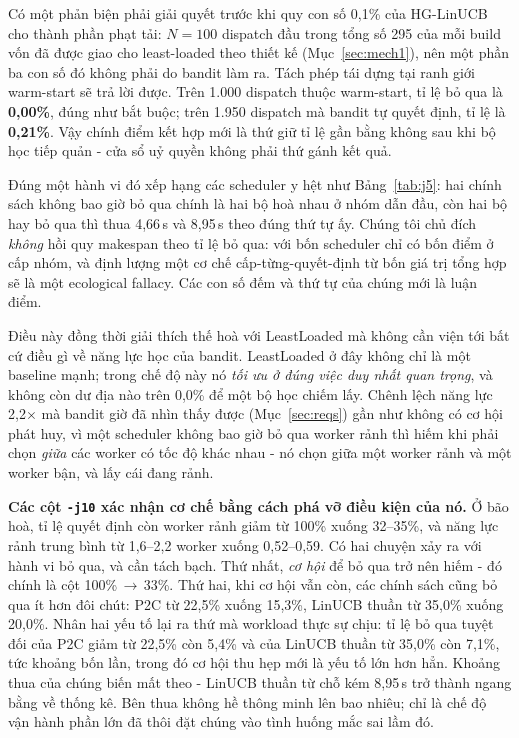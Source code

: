 \documentclass[final,5p,times,twocolumn]{elsarticle}
\begin{document}
Có một phản biện phải giải quyết trước khi quy con số 0,1\% của HG-LinUCB cho thành phần phạt tải: $N=100$ dispatch đầu trong tổng số 295 của mỗi build vốn đã được giao cho least-loaded theo thiết kế (Mục~\ref{sec:mech1}), nên một phần ba con số đó không phải do bandit làm ra. Tách phép tái dựng tại ranh giới warm-start sẽ trả lời được. Trên 1.000 dispatch thuộc warm-start, tỉ lệ bỏ qua là \textbf{0,00\%}, đúng như bắt buộc; trên 1.950 dispatch mà bandit tự quyết định, tỉ lệ là \textbf{0,21\%}. Vậy chính điểm kết hợp mới là thứ giữ tỉ lệ gần bằng không sau khi bộ học tiếp quản - cửa sổ uỷ quyền không phải thứ gánh kết quả.

Đúng một hành vi đó xếp hạng các scheduler y hệt như Bảng~\ref{tab:j5}: hai chính sách không bao giờ bỏ qua chính là hai bộ hoà nhau ở nhóm dẫn đầu, còn hai bộ hay bỏ qua thì thua 4,66\,s và 8,95\,s theo đúng thứ tự ấy. Chúng tôi chủ đích \emph{không} hồi quy makespan theo tỉ lệ bỏ qua: với bốn scheduler chỉ có bốn điểm ở cấp nhóm, và định lượng một cơ chế cấp-từng-quyết-định từ bốn giá trị tổng hợp sẽ là một ecological fallacy. Các con số đếm và thứ tự của chúng mới là luận điểm.

Điều này đồng thời giải thích thế hoà với LeastLoaded mà không cần viện tới bất cứ điều gì về năng lực học của bandit. LeastLoaded ở đây không chỉ là một baseline mạnh; trong chế độ này nó \emph{tối ưu ở đúng việc duy nhất quan trọng}, và không còn dư địa nào trên 0,0\% để một bộ học chiếm lấy. Chênh lệch năng lực 2,2$\times$ mà bandit giờ đã nhìn thấy được (Mục~\ref{sec:reqs}) gần như không có cơ hội phát huy, vì một scheduler không bao giờ bỏ qua worker rảnh thì hiếm khi phải chọn \emph{giữa} các worker có tốc độ khác nhau - nó chọn giữa một worker rảnh và một worker bận, và lấy cái đang rảnh.

\textbf{Các cột \texttt{-j10} xác nhận cơ chế bằng cách phá vỡ điều kiện của nó.} Ở bão hoà, tỉ lệ quyết định còn worker rảnh giảm từ 100\% xuống 32--35\%, và năng lực rảnh trung bình từ 1,6--2,2 worker xuống 0,52--0,59. Có hai chuyện xảy ra với hành vi bỏ qua, và cần tách bạch. Thứ nhất, \emph{cơ hội} để bỏ qua trở nên hiếm - đó chính là cột 100\%\,$\to$\,33\%. Thứ hai, khi cơ hội vẫn còn, các chính sách cũng bỏ qua ít hơn đôi chút: P2C từ 22,5\% xuống 15,3\%, LinUCB thuần từ 35,0\% xuống 20,0\%. Nhân hai yếu tố lại ra thứ mà workload thực sự chịu: tỉ lệ bỏ qua tuyệt đối của P2C giảm từ 22,5\% còn 5,4\% và của LinUCB thuần từ 35,0\% còn 7,1\%, tức khoảng bốn lần, trong đó cơ hội thu hẹp mới là yếu tố lớn hơn hẳn. Khoảng thua của chúng biến mất theo - LinUCB thuần từ chỗ kém 8,95\,s trở thành ngang bằng về thống kê. Bên thua không hề thông minh lên bao nhiêu; chỉ là chế độ vận hành phần lớn đã thôi đặt chúng vào tình huống mắc sai lầm đó.
\end{document}
